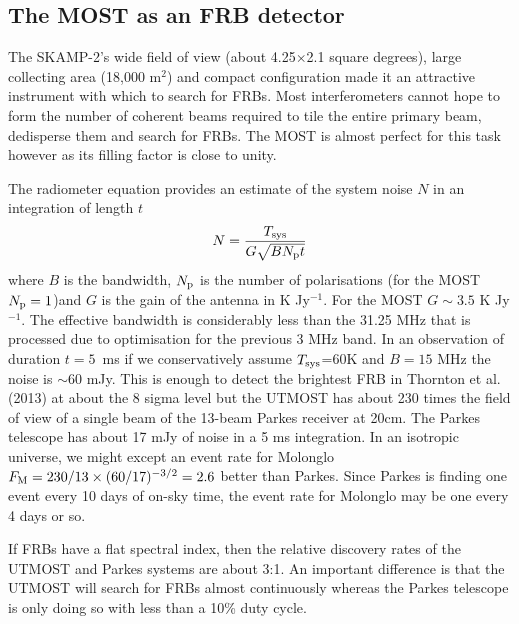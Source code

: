 \subsection{The MOST as an FRB detector}
The SKAMP-2's wide field of view (about 4.25$\times$2.1 square degrees), large collecting area (18,000 m$^2$) and compact configuration made it an attractive instrument with which to search for FRBs. Most interferometers cannot hope to form the number of coherent beams required to tile the entire primary beam, dedisperse them and search for FRBs. The MOST is almost perfect for this task however as its filling factor is close to unity. 

The radiometer equation provides an estimate of the system noise $N$ in an integration of length $t$ 
\begin{equation}
N={{T_{\rm sys}}\over{G\sqrt{BN_{\rm p}t}}}
\end{equation}
\noindent where $B$ is the bandwidth, $N_{\rm p}$ is the number of polarisations (for the MOST $N_{\rm p}=1$)and $G$ is the gain of the antenna in K Jy$^{-1}$. For the MOST $G\sim 3.5$ K Jy$^{-1}$. The effective bandwidth is considerably less than the 31.25 MHz that is processed due to optimisation for the previous 3 MHz band. In an observation of duration $t=5$\, ms if we conservatively assume $T_{\rm sys}$=60K and $B=15 $ MHz the noise is $\sim$60 mJy. This is enough to detect the brightest FRB in Thornton et al. (2013) at about the 8 sigma level but the UTMOST has about 230 times the field of view of a single beam of the 13-beam Parkes receiver at 20cm. The Parkes telescope has about 17 mJy of noise in a 5 ms integration. In an isotropic universe, we might except an event rate for Molonglo $F_{\rm M} = 230/13\times(60/17)^{-3/2}=2.6$ better than Parkes. Since Parkes is finding one event every 10 days of on-sky time, the event rate for Molonglo may be one every 4 days or so.

If FRBs have a flat spectral index, then the relative discovery rates of the UTMOST and Parkes systems are about 3:1. An important difference is that the UTMOST will search for FRBs almost continuously whereas the Parkes telescope is only doing so with less than a 10\% duty cycle.
